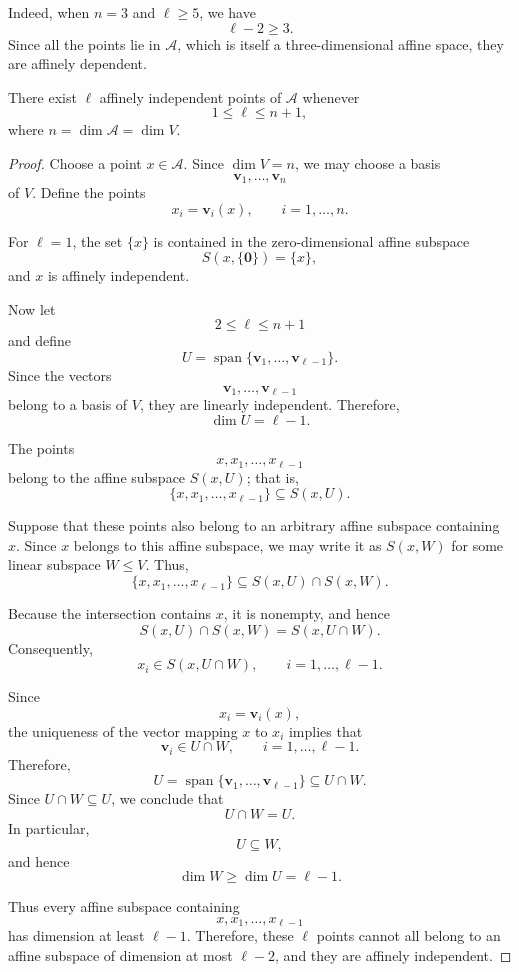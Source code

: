 \documentclass[12pt]{article}
\begin{document}
Indeed, when \(n=3\) and \(\ell\geq5\), we have
\[
\ell-2\geq3.
\]
Since all the points lie in \(\mathcal A\), which is itself a
three-dimensional affine space, they are affinely dependent.

\begin{proposition}
There exist \(\ell\) affinely independent points of \(\mathcal A\) whenever
\[
1\leq \ell\leq n+1,
\]
where \(n=\dim \mathcal A=\dim V\).
\end{proposition}

\begin{proof}
Choose a point \(x\in \mathcal A\). Since \(\dim V=n\), we may choose a basis
\[
\mathbf v_1,\ldots,\mathbf v_n
\]
of \(V\). Define the points
\[
x_i=\mathbf v_i(x),
\qquad i=1,\ldots,n.
\]

For \(\ell=1\), the set \(\{x\}\) is contained in the zero-dimensional
affine subspace
\[
S(x,\{\mathbf 0\})=\{x\},
\]
and \(x\) is affinely independent.

Now let
\[
2\leq \ell\leq n+1
\]
and define
\[
U=\operatorname{span}
\{\mathbf v_1,\ldots,\mathbf v_{\ell-1}\}.
\]
Since the vectors
\[
\mathbf v_1,\ldots,\mathbf v_{\ell-1}
\]
belong to a basis of \(V\), they are linearly independent. Therefore,
\[
\dim U=\ell-1.
\]

The points
\[
x,x_1,\ldots,x_{\ell-1}
\]
belong to the affine subspace \(S(x,U)\); that is,
\[
\{x,x_1,\ldots,x_{\ell-1}\}\subseteq S(x,U).
\]

Suppose that these points also belong to an arbitrary affine subspace
containing \(x\). Since \(x\) belongs to this affine subspace, we may
write it as \(S(x,W)\) for some linear subspace \(W\leq V\). Thus,
\[
\{x,x_1,\ldots,x_{\ell-1}\}
\subseteq S(x,U)\cap S(x,W).
\]

Because the intersection contains \(x\), it is nonempty, and hence
\[
S(x,U)\cap S(x,W)=S(x,U\cap W).
\]
Consequently,
\[
x_i\in S(x,U\cap W),
\qquad i=1,\ldots,\ell-1.
\]

Since
\[
x_i=\mathbf v_i(x),
\]
the uniqueness of the vector mapping \(x\) to \(x_i\) implies that
\[
\mathbf v_i\in U\cap W,
\qquad i=1,\ldots,\ell-1.
\]
Therefore,
\[
U
=\operatorname{span}
\{\mathbf v_1,\ldots,\mathbf v_{\ell-1}\}
\subseteq U\cap W.
\]
Since \(U\cap W\subseteq U\), we conclude that
\[
U\cap W=U.
\]
In particular,
\[
U\subseteq W,
\]
and hence
\[
\dim W\geq\dim U=\ell-1.
\]

Thus every affine subspace containing
\[
x,x_1,\ldots,x_{\ell-1}
\]
has dimension at least \(\ell-1\). Therefore, these \(\ell\) points cannot
all belong to an affine subspace of dimension at most \(\ell-2\), and
they are affinely independent.
\end{proof}
\end{document}
